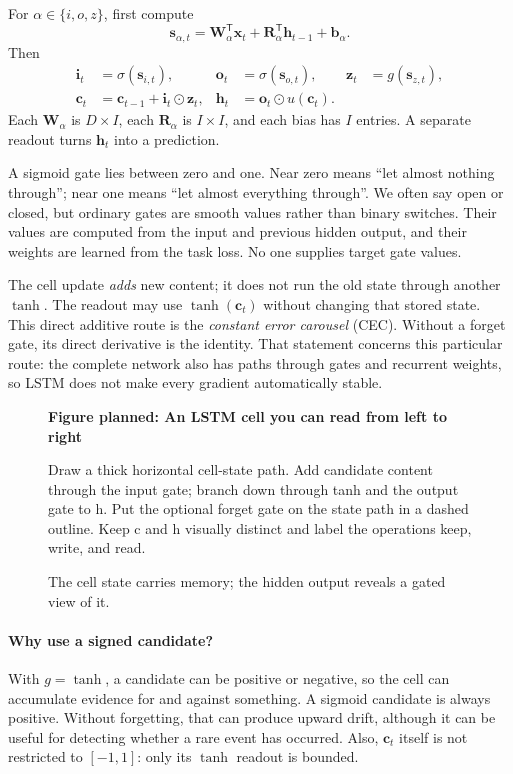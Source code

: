 \documentclass[11pt, oneside]{book}
\newcommand{\T}{^{\mathsf{T}}}           %
\newcommand{\figureplaceholder}[5]{%
\begin{figure}[htbp]
\centering
\begin{tcolorbox}[unbreakable,width=\linewidth,height=#1,colback=accent!3,
  colframe=accent!30,boxrule=0.5pt,arc=2.5mm,sharp corners=all,
  valign=center,halign=center,fontupper=\small]
{\bfseries\color{accent}Figure planned: #2}\par\medskip
{\color{gray!75!black}#3}
\end{tcolorbox}
\caption{#4}\label{#5}
\end{figure}}
\begin{document}
\begin{thmbox}[title={The basic LSTM: write and read, without a forget gate}]
For $\alpha\in\{i,o,z\}$, first compute
\[
 \mathbf{s}_{\alpha,t}=\mathbf{W}_\alpha\T\mathbf{x}_t
    +\mathbf{R}_\alpha\T\mathbf{h}_{t-1}+\mathbf{b}_\alpha.
\]
Then
\begin{align}
 \mathbf{i}_t&=\sigma(\mathbf{s}_{i,t}),&
 \mathbf{o}_t&=\sigma(\mathbf{s}_{o,t}),&
 \mathbf{z}_t&=g(\mathbf{s}_{z,t}),\label{eq:lstm-gates}\\
 \mathbf{c}_t&=\mathbf{c}_{t-1}+\mathbf{i}_t\odot\mathbf{z}_t,&
 \mathbf{h}_t&=\mathbf{o}_t\odot u(\mathbf{c}_t).\label{eq:lstm-basic}
\end{align}
Each $\mathbf{W}_\alpha$ is $D\times I$, each $\mathbf{R}_\alpha$ is $I\times I$, and each bias has $I$ entries. A separate readout turns $\mathbf{h}_t$ into a prediction.
\end{thmbox}

A sigmoid gate lies between zero and one. Near zero means ``let almost nothing through''; near one means ``let almost everything through''. We often say open or closed, but ordinary gates are smooth values rather than binary switches. Their values are computed from the input and previous hidden output, and their weights are learned from the task loss. No one supplies target gate values.

The cell update \emph{adds} new content; it does not run the old state through another $\tanh$. The readout may use $\tanh(\mathbf{c}_t)$ without changing that stored state. This direct additive route is the \emph{constant error carousel} (CEC). Without a forget gate, its direct derivative is the identity. That statement concerns this particular route: the complete network also has paths through gates and recurrent weights, so LSTM does not make every gradient automatically stable.

\figureplaceholder{4.0cm}{An LSTM cell you can read from left to right}{Draw a thick horizontal cell-state path. Add candidate content through the input gate; branch down through tanh and the output gate to h. Put the optional forget gate on the state path in a dashed outline. Keep c and h visually distinct and label the operations keep, write, and read.}{The cell state carries memory; the hidden output reveals a gated view of it.}{fig:lstm-cell}

\paragraph{Why use a signed candidate?} With $g=\tanh$, a candidate can be positive or negative, so the cell can accumulate evidence for and against something. A sigmoid candidate is always positive. Without forgetting, that can produce upward drift, although it can be useful for detecting whether a rare event has occurred. Also, $\mathbf{c}_t$ itself is not restricted to $[-1,1]$: only its $\tanh$ readout is bounded.
\end{document}
